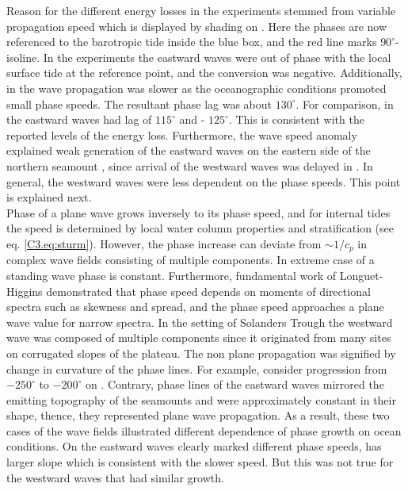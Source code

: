 \documentclass[12pt]{article}
\begin{document}
Reason for the different energy losses in the experiments stemmed from variable propagation speed 
which is displayed by 
shading on . Here the phases are now referenced to the barotropic 
tide inside the blue box, and the red line marks $90^{\circ}$-isoline. In the experiments 
the eastward waves were out of phase with the local surface tide at the reference point, and the 
conversion was negative. Additionally, in  the wave propagation was slower as the 
oceanographic conditions promoted small phase speeds. The resultant phase lag was about 
$130^{\circ}$. For comparison, in  
the eastward waves had lag of $115^{\circ}$ and  - $125^{\circ}$. This 
is consistent with the reported levels of the energy loss. Furthermore, the wave speed anomaly 
explained weak generation of the eastward waves on the eastern side of the northern seamount  
, since arrival of the westward waves 
was delayed in  . 
In general, the westward waves were less dependent on the phase speeds. This point is 
explained next.\\

Phase of a plane wave grows inversely to its phase speed, and for internal tides the speed is 
determined by local water column properties and stratification (see eq. \eqref{C3.eq:sturm}). 
However, the phase increase can deviate from $\sim 1/c_p$ in complex wave fields consisting of 
multiple components. In extreme case of a standing wave phase is constant. Furthermore, fundamental 
work of Longuet-Higgins demonstrated that phase speed depends on moments of directional spectra 
such as skewness and spread, and the phase speed approaches a plane wave value for narrow spectra. 
In the setting of Solanders Trough the westward wave was 
composed of 
multiple components since it originated from many sites on corrugated slopes of the plateau. The 
non plane propagation was signified by change in curvature of the phase 
lines. For example, consider progression from $-250^{\circ}$ to $-200^{\circ}$ on 
. Contrary, phase lines of the eastward waves mirrored the emitting 
topography of the seamounts and were approximately constant in their shape, thence, they 
represented plane wave propagation. As a result, these two cases of the wave fields illustrated 
different dependence of phase growth on ocean conditions. On  the eastward 
waves clearly marked different phase speeds,  has larger slope which is consistent with 
the slower speed. But this was not true for the westward waves that had similar growth.\\
\end{document}
